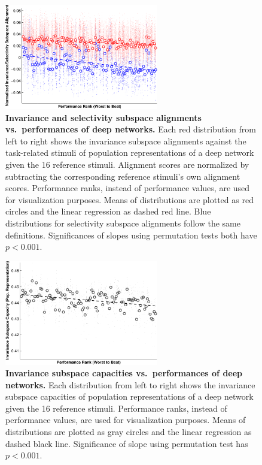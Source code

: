 \begin{figure}[H]
\centering \includegraphics[width=0.6\textwidth]{Figs/e_fig5d.pdf}
\caption{ 
{\bf Invariance and selectivity subspace alignments vs.~performances of deep networks.} Each red distribution from left to right shows the invariance subspace alignments against the task-related stimuli of population representations of a deep network given the 16 reference stimuli. Alignment scores are normalized by subtracting the corresponding reference stimuli's own alignment scores. Performance ranks, instead of performance values, are used for visualization purposes. Means of distributions are plotted as red circles and the linear regression as dashed red line. Blue distributions for selectivity subspace alignments follow the same definitions. Significances of slopes using permutation tests both have $p < 0.001$.}
\label{fig:SFaln}
\end{figure}

\begin{figure}[H]
\centering \includegraphics[width=0.6\textwidth]{Figs/e_fig5b.pdf}
\caption{ 
{\bf Invariance subspace capacities vs.~performances of deep networks.} Each distribution from left to right shows the invariance subspace capacities of population representations of a deep network given the 16 reference stimuli. Performance ranks, instead of performance values, are used for visualization purposes. Means of distributions are plotted as gray circles and the linear regression as dashed black line. Significance of slope using permutation test has $p < 0.001$.}
\label{fig:SFinc}
\end{figure}

